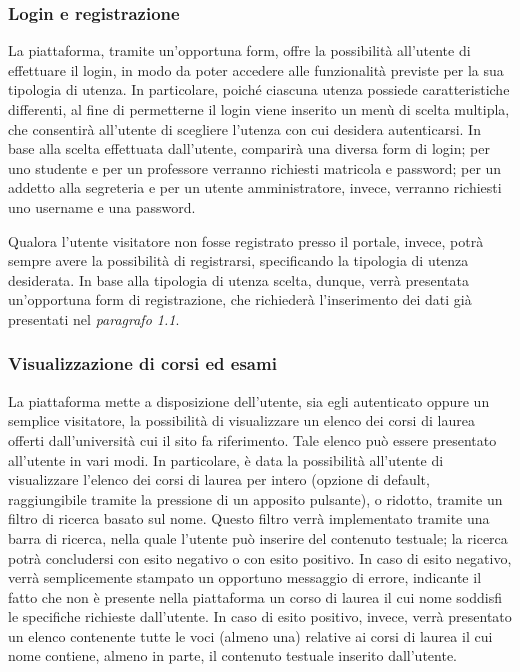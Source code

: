 \documentclass [a4paper,11pt]{book}
\begin{document}
\subsubsection{Login e registrazione}

La piattaforma, tramite un'opportuna form, offre la possibilità all'utente di effettuare il login, in modo da poter accedere alle funzionalità previste per la sua tipologia di utenza. In particolare, poiché ciascuna utenza possiede caratteristiche differenti, al fine di permetterne il login viene inserito un menù di scelta multipla, che consentirà all'utente di scegliere l'utenza con cui desidera autenticarsi. In base alla scelta effettuata dall'utente, comparirà una diversa form di login; per uno studente e per un professore verranno richiesti matricola e password; per un addetto alla segreteria e per un utente amministratore, invece, verranno richiesti uno username e una password.

Qualora l'utente visitatore non fosse registrato presso il portale, invece, potrà sempre avere la possibilità di registrarsi, specificando la tipologia di utenza desiderata. In base alla tipologia di utenza scelta, dunque, verrà presentata un'opportuna form di registrazione, che richiederà l'inserimento dei dati già presentati nel \emph{paragrafo 1.1}.

\medskip

\subsubsection{Visualizzazione di corsi ed esami}

La piattaforma mette a disposizione dell'utente, sia egli autenticato oppure un semplice visitatore, la possibilità di visualizzare un elenco dei corsi di laurea offerti dall'università cui il sito fa riferimento. Tale elenco può essere presentato all'utente in vari modi. In particolare, è data la possibilità all'utente di visualizzare l'elenco dei corsi di laurea per intero (opzione di default, raggiungibile tramite la pressione di un apposito pulsante), o ridotto, tramite un filtro di ricerca basato sul nome. Questo filtro verrà implementato tramite una barra di ricerca, nella quale l'utente può inserire del contenuto testuale; la ricerca potrà concludersi con esito negativo o con esito positivo. In caso di esito negativo, verrà semplicemente stampato un opportuno messaggio di errore, indicante il fatto che non è presente nella piattaforma un corso di laurea il cui nome soddisfi le specifiche richieste dall'utente. In caso di esito positivo, invece, verrà presentato un elenco contenente tutte le voci (almeno una) relative ai corsi di laurea il cui nome contiene, almeno in parte, il contenuto testuale inserito dall'utente.
\end{document}
